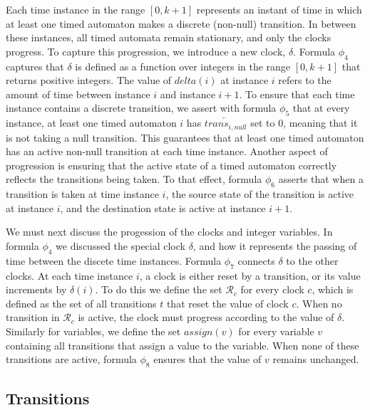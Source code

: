 \documentclass[a4paper,11pt]{article}
\begin{document}
Each time instance in the range \([0,k+1]\) represents an instant of time in
which at least one timed automaton makes a discrete (non-null) transition. In
between these instances, all timed automata remain stationary, and only the
clocks progress. To capture this progression, we introduce a new clock,
\(\delta\). Formula \(\phi_4\) captures that \(\delta\) is defined as a function
over integers in the range \([0,k+1]\) that returns positive integers. The value
of \(delta(i)\) at instance \(i\) refers to the amount of time between instance
\(i\) and instance \(i+1\). To ensure that each time instance contains a
discrete transition, we assert with formula \(\phi_5\) that at every instance,
at least one timed automaton \(i\) has \(\overleftarrow{trans_{i,null}}\) set to
0, meaning that it is not taking a null transition. This guarantees that at
least one timed automaton has an active non-null transition at each time
instance. Another aspect of progression is ensuring that the active state of a
timed automaton correctly reflects the transitions being taken. To that effect,
formula \(\phi_6\) asserts that when a transition is taken at time instance
\(i\), the source state of the transition is active at instance \(i\), and the
destination state is active at instance \(i+1\).

We must next discuss the progession of the clocks and integer variables. In
formula \(\phi_4\) we discussed the special clock \(\delta\), and how it
represents the passing of time between the discete time instances. Formula
\(\phi_7\) connects \(\delta\) to the other clocks. At each time instance \(i\),
a clock is either reset by a transition, or its value increments by
\(\delta(i)\). To do this we define the set \(\mathcal{R}_c\) for every clock
\(c\), which is defined as the set of all transitions \(t\) that reset the value
of clock \(c\). When no transition in \(\mathcal{R}_c\) is active, the clock
must progress according to the value of \(\delta\). Similarly for variables, we
define the set \(assign(v)\) for every variable \(v\) containing all transitions
that assign a value to the variable. When none of these transitions are active,
formula \(\phi_8\) ensures that the value of \(v\) remains unchanged.

\subsection{Transitions}
\label{sec:org680bac3}
\end{document}
